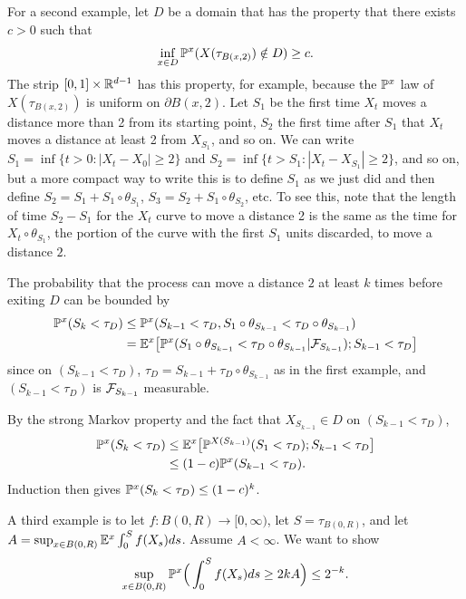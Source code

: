 For a second example, let $D$ be a domain that has the property that there exists $c > 0$ such that
\[
    \inf_{x\in D} \P^x(X(\tau_{B(x,2)}) \notin D) \geq c.
\]
The strip $[0,1] \times \R^{d-1}$ has this property, for example, because the $\P^x$ law of $X(\tau_{B(x,2)})$ is uniform on $\partial B(x,2)$. Let $S_1$ be the first time $X_t$ moves a distance more than 2 from its starting point, $S_2$ the first time after $S_1$ that $X_t$ moves a distance at least 2 from $X_{S_1}$, and so on. We can write $S_1 = \inf\{t > 0 : |X_t - X_0| \geq 2\}$ and $S_2 = \inf\{t > S_1 : |X_t - X_{S_1}| \geq 2\}$, and so on, but a more compact way to write this is to define $S_1$ as we just did and then define $S_2 = S_1 + S_1 \circ \theta_{S_1}$, $S_3 = S_2 + S_1 \circ \theta_{S_2}$, etc. To see this, note that the length of time $S_2 - S_1$ for the $X_t$ curve to move a distance 2 is the same as the time for $X_t \circ \theta_{S_1}$, the portion of the curve with the first $S_1$ units discarded, to move a distance $2$.

The probability that the process can move a distance $2$ at least $k$ times before exiting $D$ can be bounded by
\begin{align*}
    \P^x(S_k < \tau_D) &\leq \P^x(S_{k-1} < \tau_D, S_1 \circ \theta_{S_{k-1}} < \tau_D \circ \theta_{S_{k-1}}) \\
    &= \E^x\big[\P^x(S_1 \circ \theta_{S_{k-1}} < \tau_D \circ \theta_{S_{k-1}}\mid \FC_{S_{k-1}});S_{k-1} < \tau_D\big]
\end{align*}
since on $(S_{k-1} < \tau_D)$, $\tau_D = S_{k-1} + \tau_D \circ \theta_{S_{k-1}}$ as in the first example, and $(S_{k-1} < \tau_D)$ is $\FC_{S_{k-1}}$ measurable.

By the strong Markov property and the fact that $X_{S_{k-1}} \in D$ on $(S_{k-1} < \tau_D)$,
\begin{align*}
    \P^x(S_k < \tau_D) &\leq \E^x\big[\P^{X(S_{k-1})}(S_1 < \tau_D);S_{k-1} < \tau_D\big] \\
    &\leq (1-c)\P^x(S_{k-1} < \tau_D).
\end{align*}
Induction then gives $\P^x(S_k < \tau_D) \leq (1-c)^k$.

A third example is to let $f : B(0,R) \to [0,\infty)$, let $S = \tau_{B(0,R)}$, and let $A = \sup_{x\in B(0,R)} \E^x \int_0^S f(X_s)ds$. Assume $A < \infty$. We want to show
\begin{equation}\label{eq:ch1_3.9}
    \sup_{x\in B(0,R)} \P^x\Big(\int_0^S f(X_s)ds \geq 2kA\Big) \leq 2^{-k}.
\end{equation}

